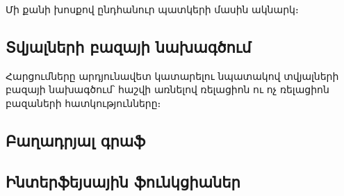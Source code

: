 {
	Մի քանի խոսքով ընդհանուր պատկերի մասին ակնարկ։

	\subsection{Տվյալների բազայի նախագծում}
	Հարցումները արդյունավետ կատարելու նպատակով տվյալների բազայի նախագծում՝ հաշվի առնելով ռելացիոն ու ոչ ռելացիոն բազաների հատկությունները։

	\subsection{Բաղադրյալ գրաֆ}
	

	\subsection{Ինտերֆեյսային ֆունկցիաներ}
}
